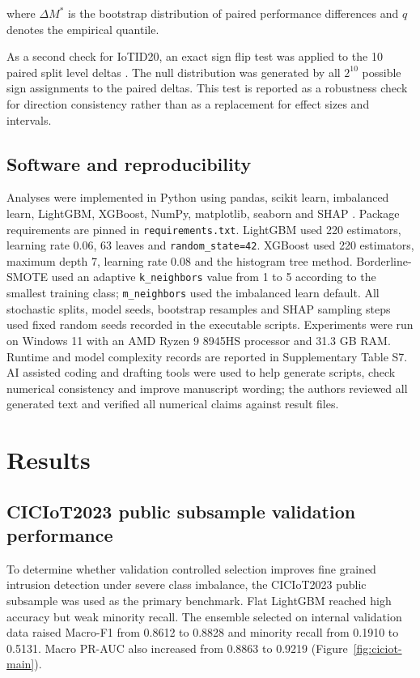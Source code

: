 \documentclass[fleqn,10pt]{wlscirep}
\begin{document}
where $\Delta M^*$ is the bootstrap distribution of paired performance differences and $q$ denotes the empirical quantile.

As a second check for IoTID20, an exact sign flip test was applied to the 10 paired split level deltas \cite{dietterich1998tests,ernst2004permutation}. The null distribution was generated by all $2^{10}$ possible sign assignments to the paired deltas. This test is reported as a robustness check for direction consistency rather than as a replacement for effect sizes and intervals.

\subsection*{Software and reproducibility}

Analyses were implemented in Python using pandas, scikit learn, imbalanced learn, LightGBM, XGBoost, NumPy, matplotlib, seaborn and SHAP \cite{lundberg2020shap}. Package requirements are pinned in \texttt{requirements.txt}. LightGBM used 220 estimators, learning rate 0.06, 63 leaves and \texttt{random\_state=42}. XGBoost used 220 estimators, maximum depth 7, learning rate 0.08 and the histogram tree method. Borderline-SMOTE used an adaptive \texttt{k\_neighbors} value from 1 to 5 according to the smallest training class; \texttt{m\_neighbors} used the imbalanced learn default. All stochastic splits, model seeds, bootstrap resamples and SHAP sampling steps used fixed random seeds recorded in the executable scripts. Experiments were run on Windows 11 with an AMD Ryzen 9 8945HS processor and 31.3 GB RAM. Runtime and model complexity records are reported in Supplementary Table S7. AI assisted coding and drafting tools were used to help generate scripts, check numerical consistency and improve manuscript wording; the authors reviewed all generated text and verified all numerical claims against result files.

\section*{Results}

\subsection*{CICIoT2023 public subsample validation performance}

To determine whether validation controlled selection improves fine grained intrusion detection under severe class imbalance, the CICIoT2023 public subsample was used as the primary benchmark. Flat LightGBM reached high accuracy but weak minority recall. The ensemble selected on internal validation data raised Macro-F1 from 0.8612 to 0.8828 and minority recall from 0.1910 to 0.5131. Macro PR-AUC also increased from 0.8863 to 0.9219 (Figure~\ref{fig:ciciot-main}).
\end{document}
